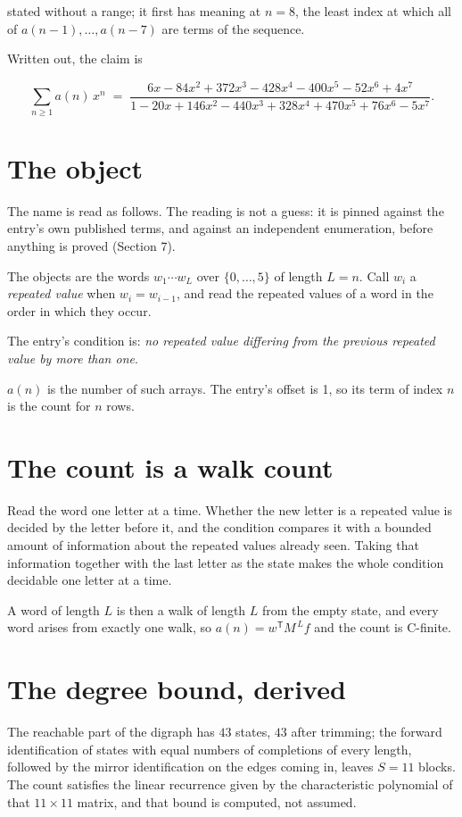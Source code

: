 \documentclass[11pt]{article}
\theoremstyle{definition}
\begin{document}
stated without a range; it first has meaning at $n = 8$, the least index at which all of $a(n-1),\dots,a(n-7)$ are terms of the sequence.

Written out, the claim is

\[\sum_{n \ge 1} a(n)\,x^n \;=\; \frac{6x - 84x^{2} + 372x^{3} - 428x^{4} - 400x^{5} - 52x^{6} + 4x^{7}}{1 - 20x + 146x^{2} - 440x^{3} + 328x^{4} + 470x^{5} + 76x^{6} - 5x^{7}}.\]

\section{The object}

The name is read as follows. The reading is not a guess: it is pinned against the entry's own published terms, and against an independent enumeration, before anything is proved (Section 7).

The objects are the words $w_1\cdots w_L$ over $\{0,\dots,5\}$ of length $L = n$. Call $w_i$ a {\itshape repeated value} when $w_i = w_{i-1}$, and read the repeated values of a word in the order in which they occur.

The entry's condition is: {\itshape no repeated value differing from the previous repeated value by more than one}.

$a(n)$ is the number of such arrays. The entry's offset is 1, so its term of index $n$ is the count for $n$ rows.

\section{The count is a walk count}

Read the word one letter at a time. Whether the new letter is a repeated value is decided by the letter before it, and the condition compares it with a bounded amount of information about the repeated values already seen. Taking that information together with the last letter as the state makes the whole condition decidable one letter at a time.

A word of length $L$ is then a walk of length $L$ from the empty state, and every word arises from exactly one walk, so $a(n) = w^{\mathsf T}M^{\,L}f$ and the count is C-finite.

\section{The degree bound, derived}

The reachable part of the digraph has $43$ states, $43$ after trimming; the forward identification of states with equal numbers of completions of every length, followed by the mirror identification on the edges coming in, leaves $S = 11$ blocks. The count satisfies the linear recurrence given by the characteristic polynomial of that $11\times11$ matrix, and that bound is computed, not assumed.
\end{document}
